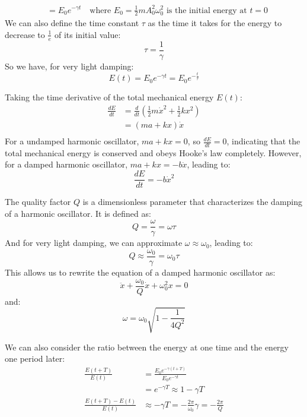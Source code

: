 \documentclass[11pt]{report}
\begin{document}
\begin{definition}
\begin{align*}
             &= E_0 e^{-\gamma t} \quad \text{where } E_0 = \frac{1}{2}m A_0^2 \omega_0^2 \text{ is the initial energy at } t=0
    \end{align*}
    We can also define the time constant \( \tau \) as the time it takes for the energy to decrease to \( \frac{1}{e} \) of its initial value:
    $$
        \tau = \frac{1}{\gamma}
    $$
    So we have, for very light damping:
    \begin{equation}\label{eq:energy_decay}
        E(t) = E_0 e^{-\gamma t} = E_0 e^{-\frac{t}{\tau}}
    \end{equation}
\end{definition}



\begin{definition}
    Taking the time derivative of the total mechanical energy \( E(t) \):
    \begin{align*}
        \frac{dE}{dt} &= \frac{d}{dt} \left(\frac{1}{2}m\dot{x}^2 + \frac{1}{2}kx^2 \right) \\
                      &= (ma + kx)\dot{x} \\
    \end{align*}
    For a undamped harmonic oscillator, \( ma + kx = 0 \), so \( \frac{dE}{dt} = 0 \), indicating that the total mechanical energy is conserved and obeys Hooke's law completely. However, for a damped harmonic oscillator, \( ma + kx = -b\dot{x} \), leading to:
    $$
        \frac{dE}{dt} = -b\dot{x}^2
    $$
\end{definition}

\begin{definition}
    The quality factor \( Q \) is a dimensionless parameter that characterizes the damping of a harmonic oscillator. It is defined as:
    \begin{equation}\label{eq:Q_factor}
        Q = \frac{\omega}{\gamma} = \omega \tau
    \end{equation}
    And for very light damping, we can approximate \( \omega \approx \omega_0 \), leading to:
    $$
        Q \approx \frac{\omega_0}{\gamma} = \omega_0 \tau
    $$
    This allows us to rewrite the equation of a damped harmonic oscillator as:
    $$
        \ddot{x} + \frac{\omega_0}{Q} \dot{x} + \omega_0^2 x = 0
    $$
    and:
    $$
        \omega = \omega_0 \sqrt{1 - \frac{1}{4Q^2}}
    $$

We can also consider the ratio between the energy at one time and the energy one period later:
\begin{align*}
    \frac{E(t + T)}{E(t)} &= \frac{E_0 e^{-\gamma (t + T)}}{E_0 e^{-\gamma t}} \\
    &= e^{-\gamma T} \approx 1 - \gamma T \\
    \frac{E(t + T) - E(t)}{E(t)} & \approx -\gamma T = -\frac{2\pi}{\omega_0} \gamma = -\frac{2\pi}{Q}
\end{align*}
\end{definition}
\end{document}
